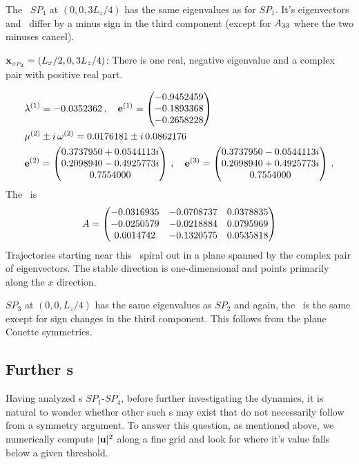 \documentclass[letter,12pt,openany]{article}
\begin{document}
The \stagp\ $SP_4$ at $(0,0,3L_z/4)$ has the same eigenvalues as for 
$SP_1$. It's eigenvectors and \velgradmat\ differ by a minus sign in the 
third component (except for $A_{33}$ where the two minuses cancel). 

$\bold{x}_{_{SP_{2}}}=(L_x/2,0,3L_z/4)$: 
There is one real, negative eigenvalue and a complex
pair with positive real part.

\begin{align}
&\eigExp[1] = -0.0352362 \,,\quad \jEigvec[1] =
\begin{pmatrix}
             {-0.9452459} \cr
             {-0.1893368} \cr
             {-0.2658228} \cr
   \end{pmatrix}
   \\
&\eigRe[2] \pm i\,\eigIm[2] = 0.0176181 \pm i\,0.0862176
   \\
&\jEigvec[2] =
\begin{pmatrix}
             {0.3737950 + 0.0544113i} \cr
             {0.2098940 - 0.4925773i} \cr
             {0.7554000} \cr
   \end{pmatrix}
\,,\quad
\jEigvec[3] =
\begin{pmatrix}
             {0.3737950 - 0.0544113i} \cr
             {0.2098940 + 0.4925773i} \cr
             {0.7554000} \cr
   \end{pmatrix}
\nnu\,.
\end{align}
The \velgradmat\ is 
\[ %
   \Mvar =
   \begin{pmatrix}
   {-0.0316935} & {-0.0708737} &  {0.0378835} \cr
  {-0.0250579} & {-0.0218884} &  {0.0795969} \cr
   {0.0014742} & {-0.1320575} &  {0.0535818} \cr
   \end{pmatrix}
\] %
Trajectories starting near this \stagp\ spiral out in a plane spanned by 
the complex pair of eigenvectors. The stable direction is one-dimensional 
and points primarily along the $x$ direction. 
    
$SP_3$ at $(0,0,L_z/4)$ has the same eigenvalues as $SP_2$ and again, the 
\velgradmat\ is the same except for sign changes in the third component. 
This follows from the plane Couette symmetries. 

\subsection{Further {\stagp}s}

Having analyzed {\stagp}s $SP_1$-$SP_4$, before further investigating the 
dynamics, it is natural to wonder whether other such {\stagp}s may exist 
that do not necessarily follow from a symmetry argument. To answer this 
question, as mentioned above, we numerically compute $|{\bf u}|^{2}$ along a 
fine grid and look for where it's value falls below a given threshold. 
\end{document}
